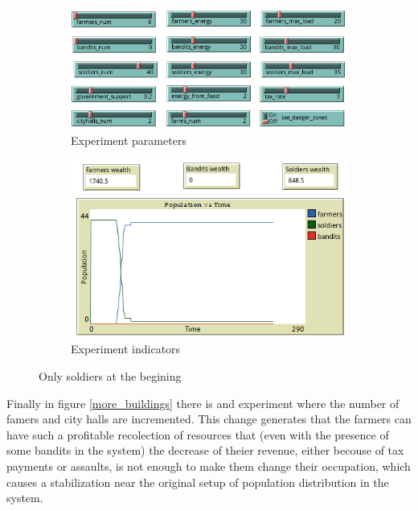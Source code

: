 \documentclass{wscpaperproc}
\begin{document}
\begin{figure}[h!]
    \begin{subfigure}{0.35\textwidth}
    \includegraphics[width=\textwidth]{Images/Exp4_sliders.png}
    \caption{Experiment parameters}
    \end{subfigure}
    \hfill
    \begin{subfigure}{0.35\textwidth}
    \includegraphics[width=\textwidth]{Images/Exp4_indicators.png}
    \caption{Experiment indicators}
    \end{subfigure}%
    \caption{Only soldiers at the begining}
    \label{soldiers_only}
\end{figure}

Finally in figure \ref{more_buildings} there is and experiment where the number
of famers and city halls are incremented. This change generates that the farmers
can have such a profitable recolection of resources that (even with the presence
of some bandits in the system) the decrease of theier revenue, either becouse of
tax payments or assaults, is not enough to make them change their occupation,
which causes a stabilization near the original setup of population distribution
in the system.
\end{document}
